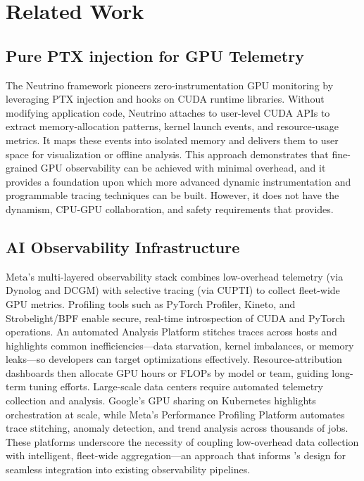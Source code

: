 \section{Related Work}\label{sec:related_work}
\subsection{Pure PTX injection for GPU Telemetry}
The Neutrino framework\cite{neutrino} pioneers zero-instrumentation GPU monitoring by leveraging PTX injection and hooks on CUDA runtime libraries. Without modifying application code, Neutrino attaches to user-level CUDA APIs to extract memory‐allocation patterns, kernel launch events, and resource‐usage metrics. It maps these events into isolated memory and delivers them to user space for visualization or offline analysis. This approach demonstrates that fine-grained GPU observability can be achieved with minimal overhead, and it provides a foundation upon which more advanced dynamic instrumentation and programmable tracing techniques can be built. However, it does not have the dynamism, CPU-GPU collaboration, and safety requirements that \sys provides.
   
\subsection{AI Observability Infrastructure}
Meta’s multi-layered observability stack\cite{ai-observability} combines low-overhead telemetry (via Dynolog and DCGM) with selective tracing (via CUPTI) to collect fleet-wide GPU metrics. Profiling tools such as PyTorch Profiler, Kineto, and Strobelight/BPF enable secure, real-time introspection of CUDA and PyTorch operations. An automated Analysis Platform stitches traces across hosts and highlights common inefficiencies—data starvation, kernel imbalances, or memory leaks—so developers can target optimizations effectively. Resource-attribution dashboards then allocate GPU hours or FLOPs by model or team, guiding long-term tuning efforts. Large-scale data centers require automated telemetry collection and analysis. Google’s GPU sharing on Kubernetes highlights orchestration at scale, while Meta’s Performance Profiling Platform automates trace stitching, anomaly detection, and trend analysis across thousands of jobs. These platforms underscore the necessity of coupling low-overhead data collection with intelligent, fleet-wide aggregation—an approach that informs \sys’s design for seamless integration into existing observability pipelines.

